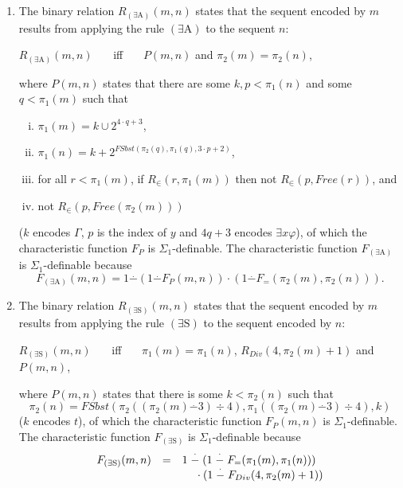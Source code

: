 \documentclass[leqno]{report}
\newcommand{\ors}{{(\lor\mathrm{S})}}
\newcommand{\ea}{{(\exists\mathrm{A})}}
\newcommand{\es}{{(\exists\mathrm{S})}}
\begin{document}
\begin{enumerate}[1.]
\begin{center}
\end{center}
($k$ encodes $\psi$), of which the characteristic function $F_P$ is $\Sigma_1$-definable. The characteristic function $F_\ors$ is $\Sigma_1$-definable because
\[
F_\ors (m, n) = 1 \stackrel{.}{-} (1 \stackrel{.}{-} F_=(\pi_1 (m), \pi_1 (n))) \cdot (1 \stackrel{.}{-} F_P(m, n)).
\]
%
\item The binary relation $R_\ea (m, n)$ states that the sequent encoded by $m$ results from applying the rule $\ea$ to the sequent $n$:
\begin{center}
$R_\ea (m, n)$ \ \ \ iff \ \ \ $P(m, n)$ and $\pi_2 (m) = \pi_2 (n)$,
\end{center}
where $P(m, n)$ states that there are some $k, p < \pi_1 (n)$ and some $q < \pi_1 (m)$ such that
\begin{enumerate}[(i)]
\item $\pi_1 (m) = k \cup 2^{4 \cdot q + 3}$,
\item $\pi_1 (n) = k + 2^{FSbst(\pi_2 (q), \pi_1 (q), 3 \cdot p + 2)}$,
\item for all $r < \pi_1 (m)$, if $R_\in (r, \pi_1 (m))$ then not $R_\in (p, Free(r))$, and
\item not $R_\in (p, Free(\pi_2 (m)))$
\end{enumerate}
($k$ encodes $\Gamma$, $p$ is the index of $y$ and $4q + 3$ encodes $\exists x \varphi$), of which the characteristic function $F_P$ is $\Sigma_1$-definable. The characteristic function $F_\ea$ is $\Sigma_1$-definable because
\[
F_\ea (m, n) = 1 \stackrel{.}{-} (1 \stackrel{.}{-} F_P(m, n)) \cdot (1 \stackrel{.}{-} F_=(\pi_2 (m), \pi_2 (n))).
\]
%
\item The binary relation $R_\es (m, n)$ states that the sequent encoded by $m$ results from applying the rule $\es$ to the sequent encoded by $n$:
\begin{center}
$R_\es (m, n)$ \ \ \ iff \ \ \ $\pi_1 (m) = \pi_1 (n)$, $R_{Div} (4, \pi_2 (m) + 1)$ and $P(m, n)$,
\end{center}
where $P(m, n)$ states that there is some $k < \pi_2 (n)$ such that
\[
\pi_2 (n) = FSbst(\pi_2 ((\pi_2 (m) \stackrel{.}{-} 3) \div 4), \pi_1 ((\pi_2 (m) \stackrel{.}{-} 3) \div 4), k)
\]
($k$ encodes $t$), of which the characteristic function $F_P(m, n)$ is $\Sigma_1$-definable. The characteristic function $F_\es$ is $\Sigma_1$-definable because
\[
\begin{array}{lll}
F_\es (m, n) & = & 1 \stackrel{.}{-} (1 \stackrel{.}{-} F_=(\pi_1 (m), \pi_1 (n)))\cr
\ & \ & \ \ \phantom{1} \cdot (1 \stackrel{.}{-} F_{Div}(4, \pi_2 (m) + 1))\cr

\end{array}\]
\end{enumerate}
\end{document}
